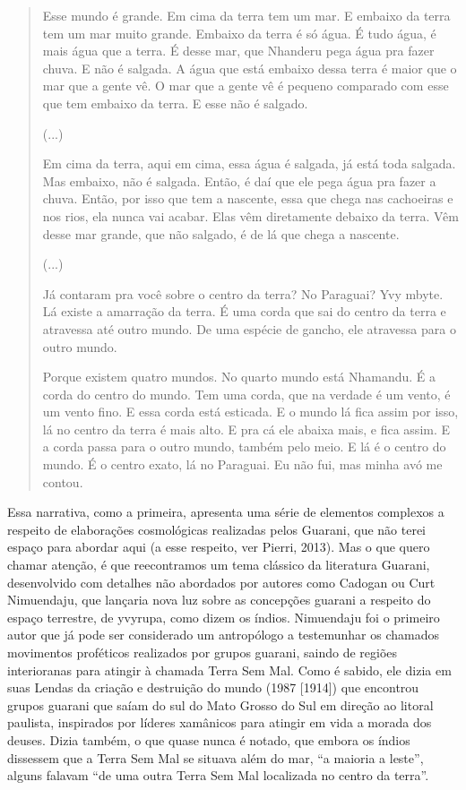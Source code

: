 \documentclass{article}
\begin{document}
\begin{quotation}
Esse mundo \'e grande. Em cima da terra tem um mar. E embaixo da terra
tem um mar muito grande. Embaixo da terra \'e s\'o \'agua. \'E tudo
\'agua, \'e mais \'agua que a terra. \'E desse mar, que Nhanderu pega
\'agua pra fazer chuva. E n\~ao \'e salgada. A \'agua que est\'a
embaixo dessa terra \'e maior que o mar que a gente v\^e. O mar que a
gente v\^e \'e pequeno comparado com esse que tem embaixo da terra. E
esse n\~ao \'e salgado.

(...)

Em cima da terra, aqui em cima, essa \'agua \'e salgada, j\'a est\'a
toda salgada. Mas embaixo, n\~ao \'e salgada. Ent\~ao, \'e da\'i que
ele pega \'agua pra fazer a chuva. Ent\~ao, por isso que tem a
nascente, essa que chega nas cachoeiras e nos rios, ela nunca vai
acabar. Elas v\^em diretamente debaixo da terra. V\^em desse mar
grande, que n\~ao salgado, \'e de l\'a que chega a nascente.

(...) 

J\'a contaram pra voc\^e sobre o centro da terra? No Paraguai? Yvy
mbyte. L\'a existe a amarra\c{c}\~ao da terra. \'E uma corda que sai do
centro da terra e atravessa at\'e outro mundo. De uma esp\'ecie de
gancho, ele atravessa para o outro mundo.

Porque existem quatro mundos. No quarto mundo est\'a Nhamandu. \'E a
corda do centro do mundo. Tem uma corda, que na verdade \'e um vento,
\'e um vento fino. E essa corda est\'a esticada. E o mundo l\'a fica
assim por isso, l\'a no centro da terra \'e mais alto. E pra c\'a ele
abaixa mais, e fica assim. E a corda passa para o outro mundo, tamb\'em
pelo meio. E l\'a \'e o centro do mundo. \'E o centro exato, l\'a no
Paraguai. Eu n\~ao fui, mas minha av\'o me contou.

\end{quotation}
Essa narrativa, como a primeira, apresenta uma s\'erie de elementos
complexos a respeito de elabora\c{c}\~oes cosmol\'ogicas realizadas
pelos Guarani, que n\~ao terei espa\c{c}o para abordar aqui (a esse
respeito, ver Pierri, 2013). Mas o que quero chamar aten\c{c}\~ao, \'e
que reecontramos um tema cl\'assico da literatura Guarani, desenvolvido
com detalhes n\~ao abordados por autores como Cadogan ou Curt
Nimuendaju, que lan\c{c}aria nova luz sobre as concep\c{c}\~oes guarani
a respeito do espa\c{c}o terrestre, de yvyrupa, como dizem os \'indios.
Nimuendaju foi o primeiro autor que j\'a pode ser considerado um
antrop\'ologo a testemunhar os chamados movimentos prof\'eticos
realizados por grupos guarani, saindo de regi\~oes interioranas para
atingir \`a chamada Terra Sem Mal. Como \'e sabido, ele dizia em suas
Lendas da cria\c{c}\~ao e destrui\c{c}\~ao do mundo (1987 [1914]) que
encontrou grupos guarani que sa\'iam do sul do Mato Grosso do Sul em
dire\c{c}\~ao ao litoral paulista, inspirados por l\'ideres xam\^anicos
para atingir em vida a morada dos deuses. Dizia tamb\'em, o que quase
nunca \'e notado, que embora os \'indios dissessem que a Terra Sem Mal
se situava al\'em do mar, {\textquotedblleft}a maioria a
leste{\textquotedblright}, alguns falavam {\textquotedblleft}de uma
outra Terra Sem Mal localizada no centro da terra{\textquotedblright}.
\end{document}
